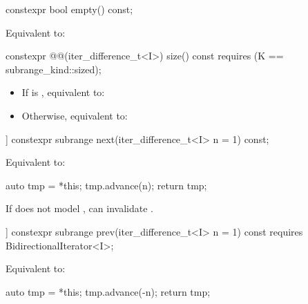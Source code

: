 %
\begin{itemdecl}
constexpr bool empty() const;
\end{itemdecl}

\begin{itemdescr}
\pnum
\effects Equivalent to: 
\end{itemdescr}

%
\begin{itemdecl}
constexpr @@(iter_difference_t<I>) size() const
  requires (K == subrange_kind::sized);
\end{itemdecl}

\begin{itemdescr}
\pnum
\effects
\begin{itemize}
\item If  is , equivalent to: 
\item Otherwise, equivalent to: 
\end{itemize}
\end{itemdescr}

%
\begin{itemdecl}
[[nodiscard]] constexpr subrange next(iter_difference_t<I> n = 1) const;
\end{itemdecl}

\begin{itemdescr}
\pnum
\effects Equivalent to:
\begin{codeblock}
auto tmp = *this;
tmp.advance(n);
return tmp;
\end{codeblock}

\pnum
\begin{note}
If  does not model , 
can invalidate .
\end{note}
\end{itemdescr}

%
\begin{itemdecl}
[[nodiscard]] constexpr subrange prev(iter_difference_t<I> n = 1) const
  requires BidirectionalIterator<I>;
\end{itemdecl}

\begin{itemdescr}
\pnum
\effects Equivalent to:
\begin{codeblock}
auto tmp = *this;
tmp.advance(-n);
return tmp;
\end{codeblock}
\end{itemdescr}

